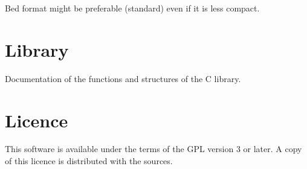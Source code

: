 \documentclass[a4paper,12pt]{article}
\begin{document}
Bed format might be preferable (standard) even if it is less compact.


\section{Library}

Documentation of the functions and structures of the C library.


\section{Licence}

This software is available under the terms of the GPL version 3 or later.
A copy of this licence is distributed with the sources.
\end{document}
